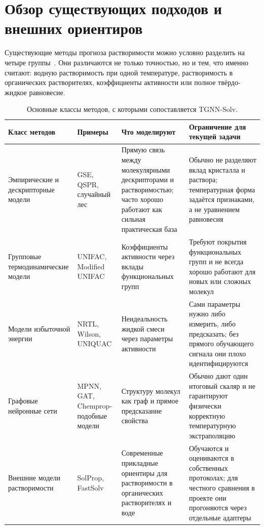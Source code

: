 \documentclass[11pt]{article}
\theoremstyle{definition}
\begin{document}
\section{Обзор существующих подходов и внешних ориентиров}
\label{sec:methods-overview}

Существующие методы прогноза растворимости можно условно разделить на четыре группы~\cite{bradley2014,lusci2013,boobier2017,francoeur2021,vermeire2021,vermeire2022}. Они различаются не только точностью, но и тем, что именно считают: водную растворимость при одной температуре, растворимость в органических растворителях, коэффициенты активности или полное твёрдо-жидкое равновесие.

\begin{table}[H]
\centering
\caption{Основные классы методов, с которыми сопоставляется TGNN-Solv.}
\label{tab:method-overview}
\small
\begin{tabularx}{\textwidth}{P{0.20\textwidth}P{0.17\textwidth}Y P{0.20\textwidth}}
\toprule
Класс методов & Примеры & Что моделируют & Ограничение для текущей задачи \\
\midrule
Эмпирические и дескрипторные модели & GSE, QSPR, случайный лес & Прямую связь между молекулярными дескрипторами и растворимостью; часто хорошо работают как сильная практическая база & Обычно не разделяют вклад кристалла и раствора; температурная форма задаётся признаками, а не уравнением равновесия \\
Групповые термодинамические модели & UNIFAC, Modified UNIFAC & Коэффициенты активности через вклады функциональных групп~\cite{fredenslund1975,weidlich1987} & Требуют покрытия функциональных групп и не всегда хорошо работают для новых или сложных молекул \\
Модели избыточной энергии & NRTL, Wilson, UNIQUAC & Неидеальность жидкой смеси через параметры активности~\cite{renon1968,wilson1964,abrams1975} & Сами параметры нужно либо измерить, либо предсказать; без прямого обучающего сигнала они плохо идентифицируются \\
Графовые нейронные сети & MPNN, GAT, Chemprop-подобные модели & Структуру молекул как граф и прямое предсказание свойства~\cite{gilmer2017,velickovic2018,yang2019} & Обычно дают один итоговый скаляр и не гарантируют физически корректную температурную экстраполяцию \\
Внешние модели растворимости & SolProp, FastSolv & Современные прикладные ориентиры для растворимости в органических растворителях и воде~\cite{vermeire2022,fastsolv2025} & Обучаются и оцениваются в собственных протоколах; для честного сравнения в проекте они прогоняются через отдельные адаптеры \\
\bottomrule
\end{tabularx}
\end{table}
\end{document}
